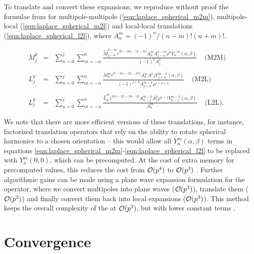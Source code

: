 To translate and convert these expansions, we reproduce without proof the formulae from \cite{greengard1987} for multipole-multipole (\ref{eqn:laplace_spherical_m2m}), multipole-local (\ref{eqn:laplace_spherical_m2l}) and local-local translations (\ref{eqn:laplace_spherical_l2l}), where $A^{m}_n = (-1)^{n}/(n-m)!(n+m)!$.

\begin{eqnarray}
	\label{eqn:laplace_spherical_m2m}
	M^k_j & = & \sum_{n=0}^j \sum_{m=-n}^n \frac{\hat{M}^{k-m}_{j-n}i^{|k|-|m|-|k-m|}A^m_nA^{k-m}_{j-n}\rho^nY^{-m}_n(\alpha,\beta)}{(-1)^nA^k_j} \;\;\;\;\text{(M2M)}\\
	& & \nonumber \\
	\label{eqn:laplace_spherical_m2l}
	L^k_j & = & \sum_{n=0}^j \sum_{m=-n}^n \frac{M^{m}_{n}i^{|k-m|-|k|-|m|}A^m_nA^{k}{j}Y^{m-k}_{j+n}(\alpha,\beta)}{(-1)^{j+k}A^{m-k}_{j+n}\rho^{j+n+1}} \;\;\;\;\text{(M2L)}\\
	& & \nonumber \\
	\label{eqn:laplace_spherical_l2l}
	L^k_j & = & \sum_{n=0}^j \sum_{m=-n}^n \frac{\hat{L}^{m}_{n} i^{|m|-|k|-|m-k|}A^{m-k}_{n-j}A^{k}_{j}\rho^{n-j}Y^{m-k}_{n-j}(\alpha,\beta)}{A^{m}_{n}}\;\;\;\;\text{(L2L)}.
\end{eqnarray}

We note that there are more efficient versions of these translations, for instance, factorized translation operators that rely on the ability to rotate spherical harmonics to a chosen orientation -- this would allow all $Y^{m}_n(\alpha,\beta)$ terms in equations \ref{eqn:laplace_spherical_m2m}-\ref{eqn:laplace_spherical_l2l} to be replaced with $Y^{m}_n(0,0)$, which can be precomputed. At the cost of extra memory for precomputed values, this reduces the cost from $\mathcal{O}(p^{4})$ to $\mathcal{O}(p^{3})$ \cite{GreengardRokhlin1997}. Further algorithmic gains can be made using a plane wave expansion formulation for the {\mtol} operator, where we convert multipoles into plane waves ($\mathcal{O}(p^{3})$), translate them ($\mathcal{O}(p^{2})$) and finally convert them back into local expansions ($\mathcal{O}(p^{3})$). This method keeps the overall complexity of the {\mtol} at $\mathcal{O}(p^{3})$, but with lower constant terms \cite{GreengardRokhlin1997}.

\section{Convergence}\label{sec:laplace_convergence}

